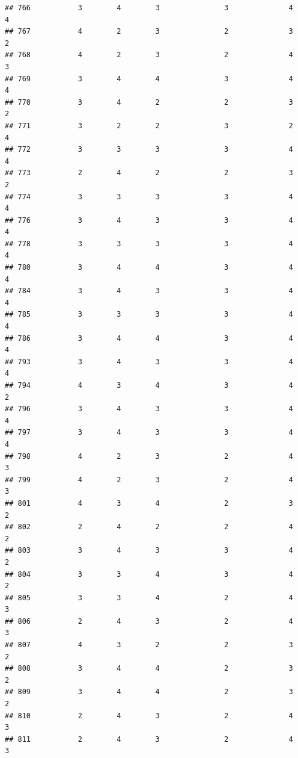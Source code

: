 \documentclass[
]{article}
\begin{document}
\begin{verbatim}
## 766           3        4        3               3              4             4
## 767           4        2        3               2              3             2
## 768           4        2        3               2              4             3
## 769           3        4        4               3              4             4
## 770           3        4        2               2              3             2
## 771           3        2        2               3              2             4
## 772           3        3        3               3              4             4
## 773           2        4        2               2              3             2
## 774           3        3        3               3              4             4
## 776           3        4        3               3              4             4
## 778           3        3        3               3              4             4
## 780           3        4        4               3              4             4
## 784           3        4        3               3              4             4
## 785           3        3        3               3              4             4
## 786           3        4        4               3              4             4
## 793           3        4        3               3              4             4
## 794           4        3        4               3              4             2
## 796           3        4        3               3              4             4
## 797           3        4        3               3              4             4
## 798           4        2        3               2              4             3
## 799           4        2        3               2              4             3
## 801           4        3        4               2              3             2
## 802           2        4        2               2              4             2
## 803           3        4        3               3              4             2
## 804           3        3        4               3              4             2
## 805           3        3        4               2              4             3
## 806           2        4        3               2              4             3
## 807           4        3        2               2              3             2
## 808           3        4        4               2              3             2
## 809           3        4        4               2              3             2
## 810           2        4        3               2              4             3
## 811           2        4        3               2              4             3

\end{verbatim}
\end{document}
